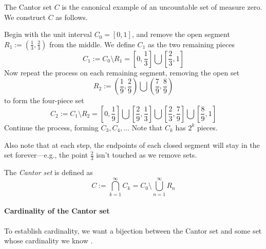 \documentclass{article}
\newcommand{\defined}{:=}
\begin{document}

The Cantor set $C$ is the canonical example of an uncountable set of measure zero.  We construct $C$ as follows.

Begin with the unit interval $C_0 = [0,1]$, and remove the open segment $R_1 \defined (\frac{1}{3},\frac{2}{3})$ from the middle.  We 
define $C_1$ as the two remaining pieces
\begin{equation}
C_1 \defined C_0 \setminus R_1 = \left[0,\frac{1}{3}\right] \bigcup \left[\frac{2}{3},1\right]
\end{equation}
Now repeat the process on each remaining segment, removing the open set
\begin{equation}
R_2 \defined \left(\frac{1}{9},\frac{2}{9}\right) \bigcup \left(\frac{7}{9},\frac{8}{9}\right)
\end{equation}
to form the four-piece set
\begin{equation}
C_2 \defined C_1 \setminus R_2 = \left[0,\frac{1}{9}\right] \bigcup \left[\frac{2}{9},\frac{1}{3}\right] \bigcup \left[\frac{2}{3},\frac{7}{9}\right] \bigcup \left[\frac{8}{9},1\right]
\end{equation}
Continue the process, forming $C_3, C_4, \ldots$  Note that $C_k$ has $2^k$ pieces.
\newline

Also note that at each step, the endpoints of each closed segment will stay in the set forever---e.g., the point $\frac{2}{3}$ isn't 
touched as we remove sets.

The \emph{Cantor set} is defined as
\begin{equation}
C \defined \bigcap_{k=1}^{\infty} C_k = C_0 \setminus \bigcup_{n=1}^{\infty}R_n
\end{equation}

\paragraph{Cardinality of the Cantor set}
To establish cardinality, we want a bijection between the Cantor set
and some set whose cardinality we know .
\end{document}
